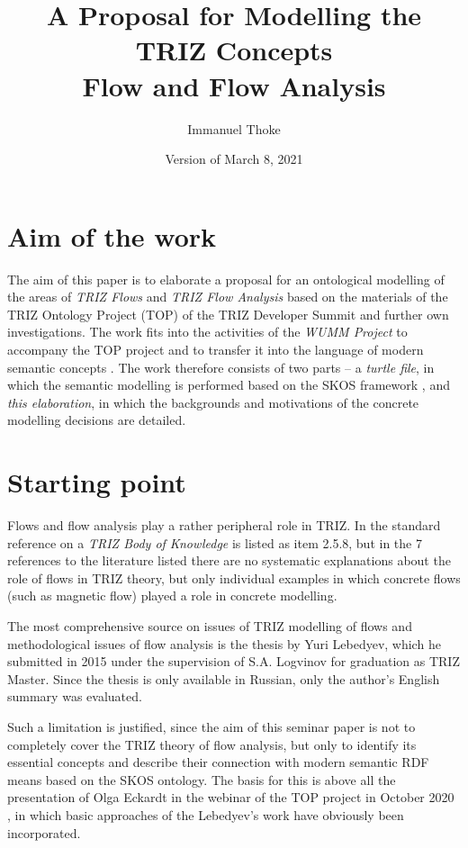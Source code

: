 \documentclass[11pt,a4paper]{article}
\title{A Proposal for Modelling the TRIZ Concepts\\ Flow and Flow Analysis}
\author{Immanuel Thoke}
\date{Version of March 8, 2021}
\begin{document}
\maketitle

\section{Aim of the work}

The aim of this paper is to elaborate a proposal for an ontological modelling
of the areas of \emph{TRIZ Flows} and \emph{TRIZ Flow Analysis} based on the
materials of the TRIZ Ontology Project (TOP) of the TRIZ Developer Summit
\cite{TOP} and further own investigations. The work fits into the activities
of the \emph{WUMM Project} \cite{WUMM} to accompany the TOP project and to
transfer it into the language of modern semantic concepts
\cite{WUMM-Ontology}.  The work therefore consists of two parts -- a
\emph{turtle file}, in which the semantic modelling is performed based on the
SKOS framework \cite{SKOS}, and \emph{this elaboration}, in which the
backgrounds and motivations of the concrete modelling decisions are detailed.

\section{Starting point} 

Flows and flow analysis play a rather peripheral role in TRIZ.  In the
standard reference \cite{Petrov2007} on a \emph{TRIZ Body of Knowledge} is
listed as item 2.5.8, but in the 7 references to the literature listed there
are no systematic explanations about the role of flows in TRIZ theory, but
only individual examples in which concrete flows (such as magnetic flow)
played a role in concrete modelling.  

The most comprehensive source on issues of TRIZ modelling of flows and
methodological issues of flow analysis is the thesis \cite{Lebedyev2015} by
Yuri Lebedyev, which he submitted in 2015 under the supervision of S.A. 
Logvinov for graduation as TRIZ Master. Since the thesis is only available in
Russian, only the author's English summary was evaluated.

Such a limitation is justified, since the aim of this seminar paper is not to
completely cover the TRIZ theory of flow analysis, but only to identify its
essential concepts and describe their connection with modern semantic RDF
means based on the SKOS ontology. The basis for this is above all the
presentation of Olga Eckardt in the webinar of the TOP project in October 2020
\cite{Eckardt2020}, in which basic approaches of the Lebedyev's work have
obviously been incorporated.
\end{document}
